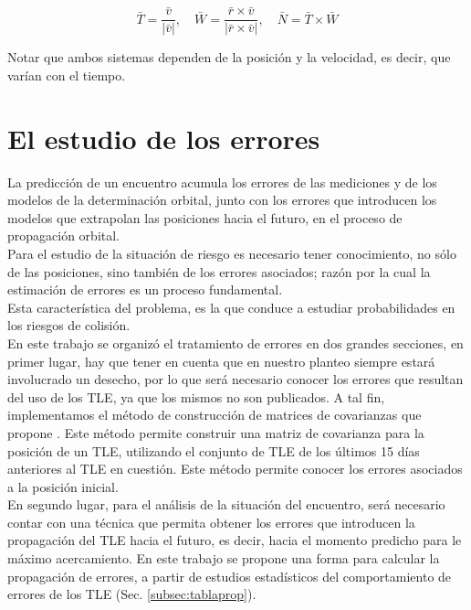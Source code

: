 {\begin{equation}
 \bar{T}=\frac{\bar{v}}{|\bar{v}|}, \quad \bar{W}=\frac{\bar{r}\times\bar{v}}{|\bar{r}\times\bar{v}|}, \quad \bar{N}=\bar{T}\times\bar{W}
\end{equation}



Notar que ambos sistemas dependen de la posici\'on y la velocidad, es decir, que var\'ian con el tiempo.\\





\section{El estudio de los errores}

La predicci\'on de un encuentro acumula los errores de las mediciones y de los modelos de la  determinaci\'on orbital, junto con los errores que introducen los modelos que extrapolan las posiciones hacia el futuro, en el proceso de propagaci\'on orbital.\\
Para el estudio de la situaci\'on de riesgo es necesario tener conocimiento, no s\'olo de las posiciones, sino tambi\'en de los errores asociados; raz\'on por la cual la estimaci\'on de errores es un proceso fundamental.\\ 
Esta caracter\'istica del problema, es la que conduce a estudiar probabilidades en los riesgos de colisi\'on.\\

En este trabajo se organiz\'o el tratamiento de errores en dos grandes secciones, en primer lugar, hay que tener en cuenta que en nuestro planteo siempre estar\'a involucrado un desecho, por lo que ser\'a necesario conocer los errores que resultan del uso de los TLE, ya que los mismos no son publicados. A tal fin, implementamos el m\'etodo de construcci\'on de matrices de covarianzas que propone \cite{osweiler}. Este m\'etodo permite construir una matriz de covarianza para la posici\'on de un TLE, utilizando el conjunto de TLE de los \'ultimos 15 d\'ias anteriores al TLE en cuesti\'on. Este m\'etodo permite conocer los errores asociados a la posici\'on inicial.\\

En segundo lugar, para el an\'alisis de la situaci\'on del encuentro, ser\'a necesario contar con una t\'ecnica que permita obtener los errores que introducen la propagaci\'on del TLE hacia el futuro, es decir, hacia el momento predicho para le m\'aximo acercamiento. En este trabajo se propone una forma para calcular la propagaci\'on de errores, a partir de estudios estad\'isticos del comportamiento de errores de los TLE (Sec. \ref{subsec:tablaprop}).\\

}
